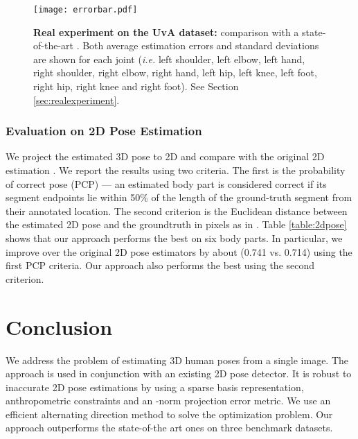 \documentclass[10pt,twocolumn,letterpaper]{article}
\begin{document}
\begin{figure}
\centering
\texttt{[image: errorbar.pdf]}
\caption{\textbf{Real experiment on the UvA dataset:} comparison
with a state-of-the-art \cite{Ramakrishna}. Both average
estimation errors and standard deviations are shown for each joint
({\em i.e.} left shoulder, left elbow, left hand, right shoulder, right
elbow, right hand, left hip, left knee, left foot, right hip,
right knee and right foot). See Section \ref{sec:realexperiment}.}
\label{fig:CMU_UVA_REAL}
\end{figure}


\subsubsection{Evaluation on 2D Pose Estimation}
We project the estimated 3D pose to 2D and compare with the
original 2D estimation \cite{Yang2D}. We report the results
using two criteria. The first is the probability of correct pose
(PCP) \cite{Yang2D} --- an estimated body part is considered correct if its
segment endpoints lie within 50\% of the length of the
ground-truth segment from their annotated location.
The second criterion is the Euclidean distance between the
estimated 2D pose and the groundtruth in pixels as in
\cite{SimoSerraCVPR2012}. Table \ref{table:2dpose} shows that our
approach performs the best on six body parts. In particular, we
improve over the original 2D pose estimators by about 
(0.741 vs. 0.714) using the first PCP criteria. Our approach also performs the best using the
second criterion.





\section{Conclusion}
\label{sec:summary} We address the problem of estimating 3D human
poses from a single image. The approach is used in conjunction
with an existing 2D pose detector. It is robust to inaccurate 2D pose
estimations by using a sparse basis representation,
anthropometric constraints and an -norm projection error
metric. We use an efficient alternating direction method to solve
the optimization problem. Our approach outperforms the
state-of-the art ones on three benchmark datasets.
\end{document}
